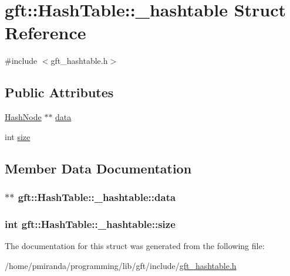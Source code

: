 \hypertarget{structgft_1_1HashTable_1_1__hashtable}{}\section{gft\+:\+:Hash\+Table\+:\+:\+\_\+hashtable Struct Reference}
\label{structgft_1_1HashTable_1_1__hashtable}


{\ttfamily \#include $<$gft\+\_\+hashtable.\+h$>$}

\subsection*{Public Attributes}
\begin{DoxyCompactItemize}
\item 
\hyperlink{namespacegft_1_1HashTable_a4eada131a57cbf3ab87cfb50823b3613}{Hash\+Node} $\ast$$\ast$ \hyperlink{structgft_1_1HashTable_1_1__hashtable_a8ef68aae14c31a437d7e789ca2236774}{data}
\item 
int \hyperlink{structgft_1_1HashTable_1_1__hashtable_a443a09f8e31532ee0c3edf8f61d015cd}{size}
\end{DoxyCompactItemize}


\subsection{Member Data Documentation}
\subsubsection[{\texorpdfstring{data}{data}}]{$\ast$$\ast$ gft\+::\+Hash\+Table\+::\+\_\+hashtable\+::data}\hypertarget{structgft_1_1HashTable_1_1__hashtable_a8ef68aae14c31a437d7e789ca2236774}{}\label{structgft_1_1HashTable_1_1__hashtable_a8ef68aae14c31a437d7e789ca2236774}
\subsubsection[{\texorpdfstring{size}{size}}]{\setlength{\rightskip}{0pt plus 5cm}int gft\+::\+Hash\+Table\+::\+\_\+hashtable\+::size}\hypertarget{structgft_1_1HashTable_1_1__hashtable_a443a09f8e31532ee0c3edf8f61d015cd}{}\label{structgft_1_1HashTable_1_1__hashtable_a443a09f8e31532ee0c3edf8f61d015cd}


The documentation for this struct was generated from the following file\+:\begin{DoxyCompactItemize}
\item 
/home/pmiranda/programming/lib/gft/include/\hyperlink{gft__hashtable_8h}{gft\+\_\+hashtable.\+h}\end{DoxyCompactItemize}
